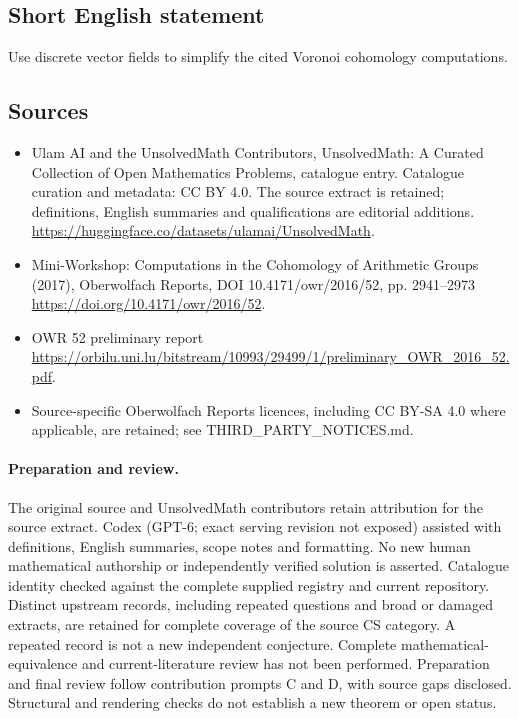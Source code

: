 \documentclass[11pt]{article}
\begin{document}
\subsection{Short English statement}
Use discrete vector fields to simplify the cited Voronoi cohomology computations.
\subsection{Sources}
\begin{itemize}
\item[\hypertarget{source:statement:1}{S1}] Ulam AI and the UnsolvedMath Contributors, UnsolvedMath: A Curated Collection of Open Mathematics Problems, catalogue entry. Catalogue curation and metadata: CC BY 4.0. The source extract is retained; definitions, English summaries and qualifications are editorial additions.
\url{https://huggingface.co/datasets/ulamai/UnsolvedMath}.
\item[\hypertarget{source:statement:2}{S2}] Mini-Workshop: Computations in the Cohomology of Arithmetic Groups (2017), Oberwolfach Reports, DOI 10.4171/owr/2016/52, pp. 2941--2973
\url{https://doi.org/10.4171/owr/2016/52}.
\item[\hypertarget{source:statement:3}{S3}] OWR 52 preliminary report
\url{https://orbilu.uni.lu/bitstream/10993/29499/1/preliminary_OWR_2016_52.pdf}.
\item Source-specific Oberwolfach Reports licences, including CC BY-SA 4.0 where applicable, are retained; see THIRD\_PARTY\_NOTICES.md.
\end{itemize}
\paragraph{Preparation and review.}
The original source and UnsolvedMath contributors retain attribution for the source extract. Codex (GPT-6; exact serving revision not exposed) assisted with definitions, English summaries, scope notes and formatting. No new human mathematical authorship or independently verified solution is asserted. Catalogue identity checked against the complete supplied registry and current repository. Distinct upstream records, including repeated questions and broad or damaged extracts, are retained for complete coverage of the source CS category. A repeated record is not a new independent conjecture. Complete mathematical-equivalence and current-literature review has not been performed. Preparation and final review follow contribution prompts C and D, with source gaps disclosed. Structural and rendering checks do not establish a new theorem or open status.
\label{end:statement}
\end{document}
